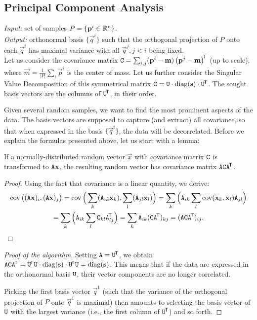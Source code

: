 \subsection{Principal Component Analysis}
\textit{Input:} set of samples $P = \{\mathbf{p}^i \in \mathbb{R}^n \}$.\\
\textit{Output:} orthonormal basis $\{\vec q^i\}$ such that the orthogonal projection of $P$ onto each $\vec q^i$ has maximal variance with all $\vec q^j, j < i$ being fixed.\\

Let us consider the covariance matrix $\mathtt{C} = \sum_{i,j} (\mathbf{p}^i - \mathbf{m}) \left(\mathbf{p}^j - \mathbf{m} \right) ^{\!\mathsf{T}}$ (up to scale), where $\vec m = \frac 1 {|P|} \sum_i \vec p^i$ is the center of mass. Let us further consider the Singular Value Decomposition of this symmetrical matrix $\mathtt{C} = \mathtt{U} \cdot \mathrm{diag}(\mathbf{s}) \cdot \mathtt{U}^{\!\mathsf{T}}$.
The sought basis vectors are the columns of $\mathtt{U}^{\!\mathsf{T}}$, in their order.

Given several random samples, we want to find the most prominent aspects of the data.
The basis vectors are supposed to capture (and extract) all covariance, so that when expressed in the basis $\{\vec q^i\}$, the data will be decorrelated.
Before we explain the formulas presented above, let us start with a lemma:

\begin{lemma}
If a normally-distributed random vector $\vec x$ with covariance matrix $\mathtt{C}$ is transformed to $\mathtt{A} \mathbf{x}$, the resulting random vector has covariance matrix $\mathtt{A} \mathtt{C} \mathtt{A} ^{\!\mathsf{T}}$.
\end{lemma}

\begin{proof}
Using the fact that covariance is a linear quantity, we derive:
\begin{multline}
\operatorname{\mathrm{cov}}\big( (\mathtt{A} \mathbf{x})_i, (\mathtt{A} \mathbf{x})_j \big) = \operatorname{\mathrm{cov}}\Big( \sum_k(\mathtt{A}_{ik} \mathbf{x}_k), \sum_l(\mathtt{A}_{jl} \mathbf{x}_l) \Big) = \sum_k \Big( \mathtt{A}_{ik} \sum_l \operatorname{\mathrm{cov}}( \mathbf{x}_k, \mathbf{x}_l ) \mathtt{A}_{jl} \Big) \\
= \sum_k \Big( \mathtt{A}_{ik} \sum_l \mathtt{C}_{kl} \mathtt{A}_{lj}^{\!\mathsf{T}} \Big) = \sum_k \mathtt{A}_{ik} (\mathtt{C} \mathtt{A} ^{\!\mathsf{T}})_{kj} = (\mathtt{A} \mathtt{C} \mathtt{A}^{\!\mathsf{T}})_{ij}.
\end{multline}
\end{proof}

\begin{proof}[Proof of the algorithm]
Setting $\mathtt{A} = \mathtt{U}^{\!\mathsf{T}}$, we obtain $\mathtt{A} \mathtt{C} \mathtt{A} ^{\!\mathsf{T}} = \mathtt{U}^{\!\mathsf{T}} \mathtt{U} \cdot \mathrm{diag}(\mathbf{s}) \cdot \mathtt{U}^{\!\mathsf{T}} \mathtt{U} = \mathrm{diag}(\mathbf{s})$.
This means that if the data are expressed in the orthonormal basis  $\mathtt{U}$, their vector components are no longer correlated.

Picking the first basis vector $\vec q^1$ (such that the variance of the orthogonal projection of $P$ onto $\vec q^1$ is maximal) then amounts to selecting the basis vector of $\mathtt{U}$ with the largest variance (i.e., the first column of $\mathtt{U} ^{\!\mathsf{T}}$) and so forth.

\end{proof}

